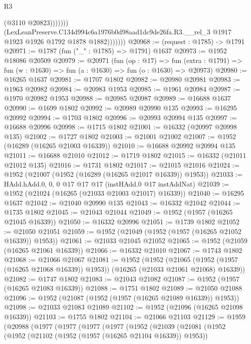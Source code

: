 \begin{lexlean}{R3}
\begin{coremodule}
                            (@3110 @20823)))))))
                (LexLeanPreserve.C134d994c6a1976b0d98aad1dc9de26fa.R3.__rel_3
                  @1917
                  @1923
                  @1926
                  @1792
                  @1878
                  @1882)))))))
@20968 := (request : @1785) -> @1791
@20971 := @1787 (fun ("_" : @1785) => @1791) @1637
@20973 := @1952 @18086 @20509
@20979 := @20971
    (fun (op : @17) =>
    fun (extra : @1791) => fun (w : @1630) => fun (a : @1630) => fun (o : @1630) => @20973)
@20980 := @16265 @1637
@20981 := @1707 @1802
@20982 := @20980 @20981
@20983 := @1963 @20982
@20984 := @20983 @1953
@20985 := @1961 @20984
@20987 := @1970 @20982 @1953
@20988 := @20985 @20987
@20989 := @16688 @1637
@20990 := @1699 @1802
@20992 := @20989 @20990 @135
@20993 := @16295 @20992
@20994 := @1703 @1802
@20996 := @20993 @20994 @135
@20997 := @16688 @20996
@20998 := @1715 @1802
@21001 := @16332 (@20997 @20998 @135)
@21002 := @1727 @1802
@21003 := @21001 @21002
@21007 := @1952 (@16289 (@16265 @21003 @16339))
@21010 := @16688 @20992 @20994 @135
@21011 := @16688 @21010
@21012 := @1719 @1802
@21015 := @16332 (@21011 @21012 @135)
@21016 := @1731 @1802
@21017 := @21015 @21016
@21024 := @1952 (@21007 (@1952 (@16289 (@16265 @21017 @16339)) @1953))
@21033 := HAdd.hAdd.{0, 0, 0} @17 @17 @17 (instHAdd.{0} @17 instAddNat)
@21039 := @1952 (@21024 (@16265 (@21033 @21003 @21017) @16339))
@21040 := @16295 @1637
@21042 := @21040 @20990 @135
@21043 := @16332 @21042
@21044 := @1735 @1802
@21045 := @21043 @21044
@21049 := @1952 (@1957 (@16265 @21045 @16339))
@21050 := @16332 @20996
@21051 := @1739 @1802
@21052 := @21050 @21051
@21059 := @1952 (@21049 (@1952 (@1957 (@16265 @21052 @16339)) @1953))
@21061 := @21033 @21045 @21052
@21065 := @1952 (@21059 (@16265 @21061 @16339))
@21066 := @16332 @21010
@21067 := @1743 @1802
@21068 := @21066 @21067
@21081 := @1952
    (@1952
      (@21065 (@1952 (@1957 (@16265 @21068 @16339)) @1953))
      (@16265 (@21033 @21061 @21068) @16339))
@21082 := @1747 @1802
@21083 := @21043 @21082
@21087 := @1952 (@1957 (@16265 @21083 @16339))
@21088 := @1751 @1802
@21089 := @21050 @21088
@21096 := @1952 (@21087 (@1952 (@1957 (@16265 @21089 @16339)) @1953))
@21098 := @21033 @21083 @21089
@21102 := @1952 (@21096 (@16265 @21098 @16339))
@21103 := @1755 @1802
@21104 := @21066 @21103
@21129 := @1959
    (@20988
      (@1977
        (@1977
          (@1977
            (@1977
              (@1952
                (@21039
                  (@21081
                    (@1952
                      (@1952
                        (@21102 (@1952 (@1957 (@16265 @21104 @16339)) @1953))

\end{coremodule}
\end{lexlean}
